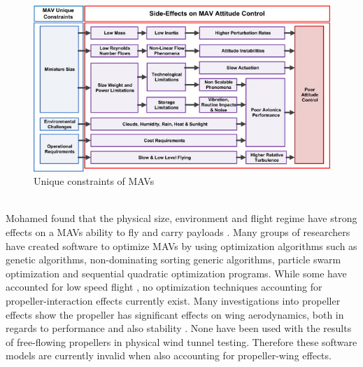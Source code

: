 \begin{figure}[H]
  \centering
   \includegraphics[width=\linewidth]{03_LiteratureReview/Figs/fowchart.jpg}
  \caption{Unique constraints of MAVs \cite{Mohamed2014}}
  \label{fig:MAVconstrain}
\end{figure}
\\
Mohamed found that the physical size, environment and flight regime have strong effects on a MAVs ability to fly and carry payloads \cite{Mohamed2014}. Many groups of researchers have created software to optimize MAVs by using optimization algorithms such as genetic algorithms, non-dominating sorting generic algorithms, particle swarm optimization and sequential quadratic optimization programs. While some have accounted for low speed flight \cite{Vijayanandh2019} \cite{Bronz2009} \cite{HASSANALIAN2019}, no optimization techniques accounting for propeller-interaction effects currently exist. Many investigations into propeller effects show the propeller has significant effects on wing aerodynamics, both in regards to performance and also stability \cite{Parga2007} \cite{Jana2020}. None have been used with the results of free-flowing propellers in physical wind tunnel testing. Therefore these software models are currently invalid when also accounting for propeller-wing effects.


